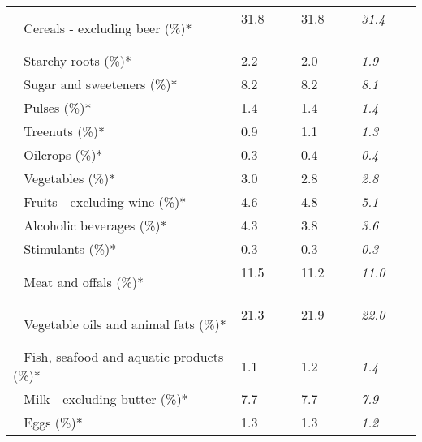 \begin{tabular}{L{3.9cm} R{1cm} R{1cm} R{1cm}}
	 ~ Cereals - excluding beer (\%)* & 31.8 ~ \ \ & 31.8 ~ \ \ & \textit{31.4} ~ \ \ \\ 
	 ~ Starchy roots (\%)* & 2.2 ~ \ \ & 2.0 ~ \ \ & \textit{1.9} ~ \ \ \\ 
	 ~ Sugar and sweeteners (\%)* & 8.2 ~ \ \ & 8.2 ~ \ \ & \textit{8.1} ~ \ \ \\ 
	 ~ Pulses (\%)* & 1.4 ~ \ \ & 1.4 ~ \ \ & \textit{1.4} ~ \ \ \\ 
	 ~ Treenuts (\%)* & 0.9 ~ \ \ & 1.1 ~ \ \ & \textit{1.3} ~ \ \ \\ 
	 ~ Oilcrops (\%)* & 0.3 ~ \ \ & 0.4 ~ \ \ & \textit{0.4} ~ \ \ \\ 
	 ~ Vegetables (\%)* & 3.0 ~ \ \ & 2.8 ~ \ \ & \textit{2.8} ~ \ \ \\ 
	 ~ Fruits - excluding wine (\%)* & 4.6 ~ \ \ & 4.8 ~ \ \ & \textit{5.1} ~ \ \ \\ 
	 ~ Alcoholic beverages (\%)* & 4.3 ~ \ \ & 3.8 ~ \ \ & \textit{3.6} ~ \ \ \\ 
	 ~ Stimulants (\%)* & 0.3 ~ \ \ & 0.3 ~ \ \ & \textit{0.3} ~ \ \ \\ 
	 ~ Meat and offals (\%)* & 11.5 ~ \ \ & 11.2 ~ \ \ & \textit{11.0} ~ \ \ \\ 
	 ~ Vegetable oils and animal fats (\%)* & 21.3 ~ \ \ & 21.9 ~ \ \ & \textit{22.0} ~ \ \ \\ 
	 ~ Fish, seafood and aquatic products (\%)* & 1.1 ~ \ \ & 1.2 ~ \ \ & \textit{1.4} ~ \ \ \\ 
	 ~ Milk - excluding butter (\%)* & 7.7 ~ \ \ & 7.7 ~ \ \ & \textit{7.9} ~ \ \ \\ 
	 ~ Eggs (\%)* & 1.3 ~ \ \ & 1.3 ~ \ \ & \textit{1.2} ~ \ \ \\ 
       \toprule
      \end{tabular}
      \clearpage
{}
